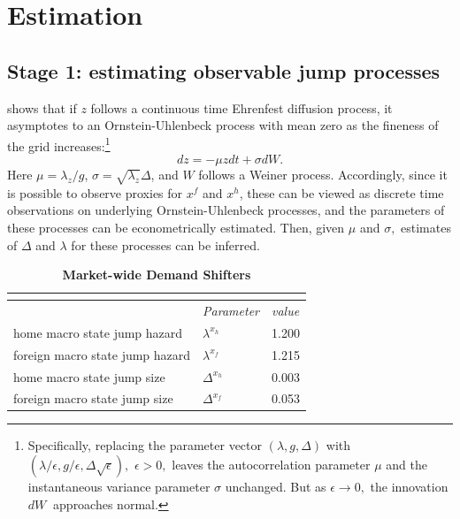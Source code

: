 \section{Estimation}

\subsection{Stage 1: estimating observable jump processes}

\citet{shimer2005cyclical} shows that if $z$ follows a continuous time Ehrenfest
diffusion process, it asymptotes to an Ornstein-Uhlenbeck process with mean
zero as the fineness of the grid increases:\footnote{%
Specifically, replacing the parameter vector $(\lambda ,g,\Delta )$ with $%
(\lambda /\epsilon ,g/\epsilon ,\Delta \sqrt{\epsilon }),$ $\epsilon >0,$
leaves the autocorrelation parameter $\mu $ and the instantaneous variance
parameter $\sigma $ unchanged. But as $\epsilon \rightarrow 0,$ the
innovation $dW$ $\ $approaches normal.\medskip} 
\begin{equation*}
dz=-\mu zdt+\sigma dW.
\end{equation*}%
Here $\mu =\lambda _{z}/g$, $\sigma =\sqrt{\lambda _{z}}\Delta $, and $W$
follows a Weiner process. Accordingly, since it is possible to observe
proxies for $x^{f}$ and $x^{h}$, these can be viewed as discrete time
observations on underlying Ornstein-Uhlenbeck processes, and the parameters
of these processes can be econometrically estimated. Then, given $\mu $ and $%
\sigma ,$ estimates of $\Delta $ and $\lambda $ for these processes can be
inferred.

\begin{table}
    \centering
    \begin{tabular}{lll}
        \multicolumn{3}{c}{\textbf{}} \\ 
        \hline\hline
        & \textit{Parameter} & \textit{value} \\ \hline
        home macro state jump hazard    & $\lambda ^{x_{h}}$ & \multicolumn{1}{c}{1.200}  \\
        foreign macro state jump hazard & $\lambda ^{x_{f}}$ & \multicolumn{1}{c}{ 1.215} \\
        home macro state jump size      & $\Delta ^{x_{h}}$  & \multicolumn{1}{c}{0.003}  \\
        foreign macro state jump size   & $\Delta ^{x_{f}}$  & \multicolumn{1}{c}{0.053}  \\ \hline
    \end{tabular}%
    \caption{\textbf{Market-wide Demand Shifters}}
    \label{tab:dem_shift}
\end{table}


